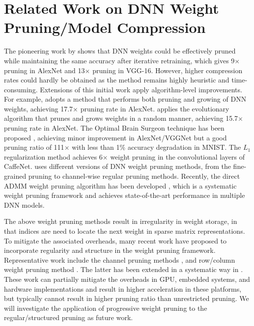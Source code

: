 \documentclass{article} %
\begin{document}
\section{Related Work on DNN Weight Pruning/Model Compression}

The pioneering work by \citet{han2015learning} shows that DNN weights could be effectively pruned while maintaining the same accuracy after iterative retraining, which gives 9$\times$ pruning in AlexNet and 13$\times$ pruning in VGG-16. 
However, higher compression rates could hardly be obtained as the method remains highly heuristic and time-consuming. Extensions of this initial work apply algorithm-level improvements. 
For example, \citet{guo2016dynamic} adopts a method that performs both pruning and growing of DNN weights, achieving 17.7$\times$ pruning rate in AlexNet.
\citet{dai2017nest} applies the evolutionary algorithm that prunes and grows weights in a random manner, achieving 15.7$\times$ pruning rate in AlexNet. The Optimal Brain Surgeon technique has been proposed \citet{dong2017learning}, achieving minor improvement in AlexNet/VGGNet but a good pruning ratio of 111$\times$ with less than 1\% accuracy degradation in MNIST. The $L_1$ regularization method \citep{wen2016learning} achieves 6$\times$ weight pruning in the convolutional layers of CaffeNet. \citet{mao2017exploring} uses different versions of DNN weight pruning methods, from the fine-grained pruning to channel-wise regular pruning methods.
Recently, the direct ADMM weight pruning algorithm has been developed \citep{zhang2018systematic}, which is a systematic weight pruning framework and achieves state-of-the-art performance in multiple DNN models.

The above weight pruning methods result in irregularity in weight storage, in that indices are need to locate the next weight in sparse matrix representations. To mitigate the associated overheads, many recent work have proposed to incorporate regularity and structure in the weight pruning framework. Representative work include the channel pruning methods \citep{he2017channel,mao2017exploring}, and row/column weight pruning method \citep{wen2016learning}. The latter has been extended in a systematic way in \citet{zhang2018adam}. These work can partially mitigate the overheads in GPU, embedded systems, and hardware implementations and result in higher acceleration in these platforms, but typically cannot result in higher pruning ratio than unrestricted pruning. We will investigate the application of progressive weight pruning to the regular/structured pruning as future work.
\end{document}
